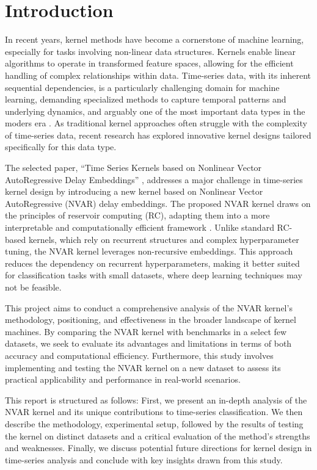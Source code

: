 \chapter{Introduction} \label{chap:intro}

In recent years, kernel methods have become a cornerstone of machine learning, especially for tasks involving non-linear data structures. Kernels enable linear algorithms to operate in transformed feature spaces, allowing for the efficient handling of complex relationships within data. Time-series data, with its inherent sequential dependencies, is a particularly challenging domain for machine learning, demanding specialized methods to capture temporal patterns and underlying dynamics, and arguably one of the most important data types in the moders era \cite{hamilton1994, strogatz2018, zhang2017, zeroual2020}. As traditional kernel approaches often struggle with the complexity of time-series data, recent research has explored innovative kernel designs tailored specifically for this data type.

The selected paper, ``Time Series Kernels based on Nonlinear Vector AutoRegressive Delay Embeddings'' \cite{felice2023}, addresses a major challenge in time-series kernel design by introducing a new kernel based on Nonlinear Vector AutoRegressive (NVAR) delay embeddings. The proposed NVAR kernel draws on the principles of reservoir computing (RC), adapting them into a more interpretable and computationally efficient framework \cite{bollt2021}. Unlike standard RC-based kernels, which rely on recurrent structures and complex hyperparameter tuning, the NVAR kernel leverages non-recursive embeddings. This approach reduces the dependency on recurrent hyperparameters, making it better suited for classification tasks with small datasets, where deep learning techniques may not be feasible.

This project aims to conduct a comprehensive analysis of the NVAR kernel's methodology, positioning, and effectiveness in the broader landscape of kernel machines. By comparing the NVAR kernel with benchmarks in a select few datasets, we seek to evaluate its advantages and limitations in terms of both accuracy and computational efficiency. Furthermore, this study involves implementing and testing the NVAR kernel on a new dataset to assess its practical applicability and performance in real-world scenarios.

This report is structured as follows: First, we present an in-depth analysis of the NVAR kernel and its unique contributions to time-series classification. We then describe the methodology, experimental setup, followed by the results of testing the kernel on distinct datasets and a critical evaluation of the method's strengths and weaknesses. Finally, we discuss potential future directions for kernel design in time-series analysis and conclude with key insights drawn from this study.
